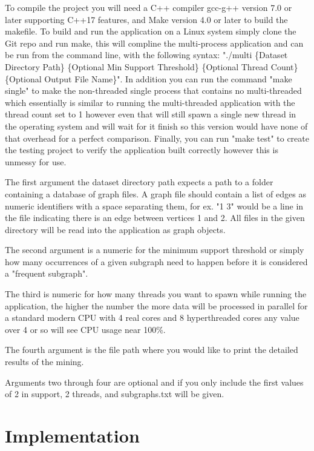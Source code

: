 \documentclass{article}
\begin{document}
To compile the project you will need a C++ compiler gcc-g++ version 7.0 or later supporting C++17 features, and Make version 4.0 or later to build the makefile. To build and run the application on a Linux system simply clone the Git repo and run make, this will compline the multi-process application and can be run from the command line, with the following syntax: 
"./multi \{Dataset Directory Path\} \{Optional Min Support Threshold\} \{Optional Thread Count\}\{Optional Output File Name\}".
In addition you can run the command "make single" to make the non-threaded single process that contains no multi-threaded which essentially is similar to running the multi-threaded application with the thread count set to 1 however even that will still spawn a single new thread in the operating system and will wait for it finish so this version would have none of that overhead for a perfect comparison. Finally, you can run  "make test" to create the testing project to verify the application built correctly however this is unmessy for use. 

The first argument the dataset directory path expects a path to a folder containing a database of graph files. A graph file should contain a list of edges as numeric identifiers with a space separating them, for ex. "1 3" would be a line in the file indicating there is an edge between vertices 1 and 2. All files in the given directory will be read into the application as graph objects.

The second argument is a numeric for the minimum support threshold or simply how many occurrences of a given subgraph need to happen before it is considered a "frequent subgraph". 

The third is numeric for how many threads you want to spawn while running the application, the higher the number the more data will be processed in parallel for a standard modern CPU with 4 real cores and 8 hyperthreaded cores any value over 4 or so will see CPU usage near 100\%.

The fourth argument is the file path where you would like to print the detailed results of the mining.

Arguments two through four are optional and if you only include the first values of 2 in support, 2 threads, and subgraphs.txt will be given. 

\section{Implementation}
\end{document}
